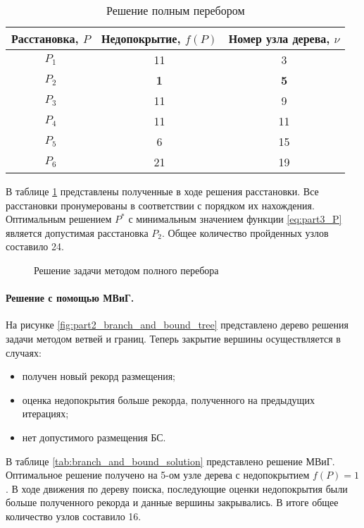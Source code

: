 \begin{table}[h!]\centering
  \begin{tabular}{|c|c|c|}\hline
      
      Расстановка, $P$ & Недопокрытие, $f(P)$ & Номер узла дерева, $\nu$\\
      \hline
      $P_1$ & 11 & 3\\
      \textit{\textbf{$P_2$}} & \textbf{1} & \textbf{5}\\
      $P_3$ & 11 & 9\\
      $P_4$ & 11 & 11\\
      $P_5$ & 6 & 15\\
      $P_6$ & 21 & 19\\
      \hline

\end{tabular}\caption{Решение полным перебором}\label{tab:brute_force_solution}
\end{table}

В таблице \cref{tab:brute_force_solution} представлены полученные в ходе решения расстановки. Все расстановки пронумерованы в соответствии с порядком их нахождения. Оптимальным решением $P^*$ с минимальным значением функции \cref{eq:part3_P} является допустимая расстановка $P_2$. Общее количество пройденных узлов составило 24.


\begin{figure}[ht]
  \caption{Решение задачи методом полного перебора}\label{fig:part2_brute_force_tree}
\end{figure}

\paragraph{Решение с помощью МВиГ.}

 На рисунке \cref{fig:part2_branch_and_bound_tree} представлено дерево решения задачи методом ветвей и границ. Теперь закрытие вершины осуществляется в случаях:
 \begin{itemize}
   \item получен новый рекорд размещения;
   \item оценка недопокрытия больше рекорда, полученного на предыдущих итерациях;
   \item нет допустимого размещения БС.
\end{itemize} 


В таблице \cref{tab:branch_and_bound_solution} представлено решение МВиГ. Оптимальное решение получено на 5-ом узле дерева с недопокрытием $f(P)=1$. В ходе движения по дереву поиска, последующие оценки недопокрытия были больше полученного рекорда и данные вершины закрывались. В итоге общее количество узлов составило 16.


